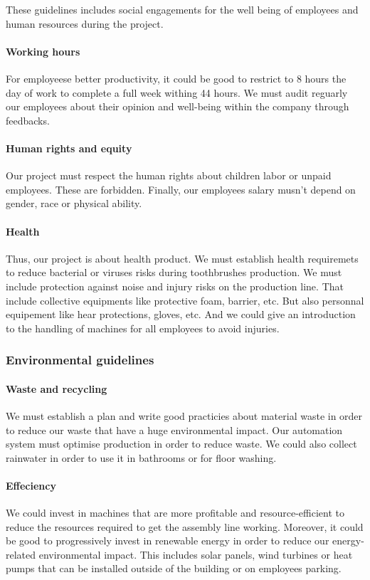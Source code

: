 These guidelines includes social engagements for the well being of employees and human resources during the project.

\paragraph{Working hours} For employeese better productivity, it could be good to restrict to 8 hours the day of work to complete a full week withing 44 hours.
We must audit reguarly our employees about their opinion and well-being within the company through feedbacks.

\paragraph{Human rights and equity} Our project must respect the human rights about children labor or unpaid employees.
These are forbidden.
Finally, our employees salary musn't depend on gender, race or physical ability. 

\paragraph{Health} Thus, our project is about health product.
We must establish health requiremets to reduce bacterial or viruses risks during toothbrushes production.
We must include protection against noise and injury risks on the production line.
That include collective equipments like protective foam, barrier, etc.
But also personnal equipement like hear protections, gloves, etc.
And we could give an introduction to the handling of machines for all employees to avoid injuries.

\subsubsection{Environmental guidelines}

\paragraph{Waste and recycling} We must establish a plan and write good practicies about material waste in order to reduce our waste that have a huge environmental impact.
Our automation system must optimise production in order to reduce waste.
We could also collect rainwater in order to use it in bathrooms or for floor washing.

\paragraph{Effeciency} We could invest in machines that are more profitable and resource-efficient to reduce the resources required to get the assembly line working.
Moreover, it could be good to progressively invest in renewable energy in order to reduce our energy-related environmental impact.
This includes solar panels, wind turbines or heat pumps that can be installed outside of the building or on employees parking.

